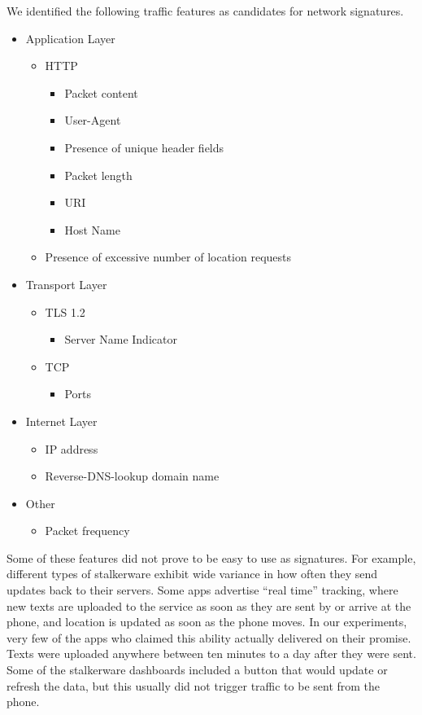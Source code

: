 \documentclass[acmtog]{acmart}
\begin{document}
We identified the following traffic features as candidates for network 
signatures.
\begin{itemize}
	\item Application Layer
	\begin{itemize}
		\item HTTP
		\begin{itemize}
			\item Packet content
			\item User-Agent
			\item Presence of unique header fields 
			\item Packet length
			\item URI
			\item Host Name
		\end{itemize}
		\item Presence of excessive number of location requests
	\end{itemize}
	\item Transport Layer
	\begin{itemize}
		\item TLS 1.2
		\begin{itemize}
			\item Server Name Indicator
		\end{itemize}
		\item TCP
		\begin{itemize}
			\item Ports
		\end{itemize}
	\end{itemize}
	\item Internet Layer
	\begin{itemize}
		\item IP address
		\item Reverse-DNS-lookup domain name
	\end{itemize}
	\item Other
	\begin{itemize}
		\item Packet frequency
	\end{itemize}
\end{itemize} 

Some of these features did not prove to be easy to use as signatures.
For example, different types of stalkerware exhibit wide variance in how often 
they send updates back to their servers. Some apps advertise 
``real time'' tracking, where new texts are uploaded to the service as soon as 
they are sent by or arrive at the phone, and location is updated as soon as the 
phone moves. In our experiments, very few of the apps who claimed this ability 
actually delivered on their promise. Texts were uploaded anywhere between ten 
minutes to a day after they were sent. Some of the stalkerware dashboards 
included a button that would update or refresh the data, but this usually did 
not trigger traffic to be sent from the phone.
\end{document}

